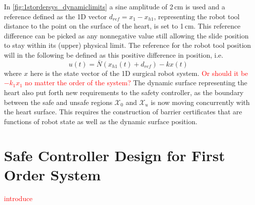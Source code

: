 In \autoref{fig:1stordersys_dynamiclimits} a sine amplitude of 2\,cm is used and a reference defined as the 1D vector $d_{ref}=x_1-x_{h1}$, representing the robot tool distance to the point on the surface of the heart, is set to 1\,cm. This reference difference can be picked as any nonnegative value still allowing the slide position to stay within its (upper) physical limit.
The reference for the robot tool position will in the following be defined as this positive difference in position, i.e.
\begin{equation}
u(t) = \bar{N}(x_{h1}(t)+d_{ref})-kx(t)
\end{equation}
where $x$ here is the state vector of the 1D surgical robot system. \textcolor{red}{Or should it be $-k_1x_1$ no matter the order of the system?}
The dynamic surface representing the heart also put forth new requirements to the safety controller, as the boundary between the safe and unsafe regions $\mathcal{X}_0$ and $\mathcal{X}_u$ is now moving concurrently with the heart surface. This requires the construction of barrier certificates that are functions of robot state as well as the dynamic surface position.



\section{Safe Controller Design for First Order System}
\textcolor{red}{introduce}

